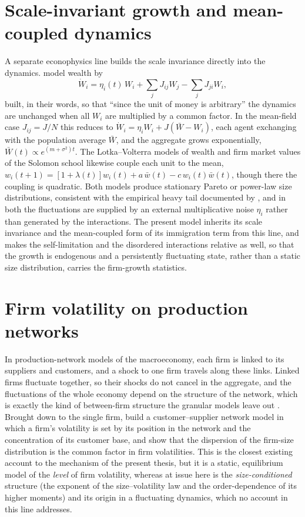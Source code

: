 \section{Scale-invariant growth and mean-coupled dynamics}
\label{sec:bg-scaleinv}

A separate econophysics line builds the scale invariance directly into the dynamics.
\citet{bouchaudmezard2000} model wealth by
\begin{equation}
    \dot W_i = \eta_i(t)\,W_i + \sum_{j} J_{ij} W_j - \sum_{j} J_{ji} W_i,
    \label{eq:bg-bm}
\end{equation}
built, in their words, so that ``since the unit of money is arbitrary'' the dynamics are
unchanged when all $W_i$ are multiplied by a common factor. In the mean-field case
$J_{ij} = J/N$ this reduces to $\dot W_i = \eta_i W_i + J(\bar W - W_i)$, each agent exchanging
with the population average $\bar W$, and the aggregate grows exponentially, $\bar W(t) \propto
e^{(m+\sigma^2)t}$. The Lotka--Volterra models of wealth and firm market values of the
Solomon school \citep{malcai2002} likewise couple each unit to the mean, $w_i(t+1) =
[1+\lambda(t)]w_i(t) + a\,\bar w(t) - c\,w_i(t)\bar w(t)$, though there the coupling is
quadratic. Both models produce stationary Pareto or power-law size
distributions, consistent with the empirical heavy tail documented by \citet{axtell2001}, and in both the fluctuations
are supplied by an external multiplicative noise $\eta_i$ rather than generated by the
interactions. The present model inherits its scale invariance and the mean-coupled form of its
immigration term from this line, and makes the
self-limitation and the disordered interactions relative as well, so that the growth is
endogenous and a persistently fluctuating state, rather than a static size distribution, carries
the firm-growth statistics.

\section{Firm volatility on production networks}
\label{sec:bg-network}

In production-network models of the macroeconomy, each firm is linked to its suppliers
and customers, and a shock to one firm travels along these links. Linked firms fluctuate
together, so their shocks do not cancel in the aggregate, and the fluctuations of the
whole economy depend on the structure of the network, which is exactly the kind of
between-firm structure the granular models leave out
\citep{acemoglu2012, carvalho2019}. Brought down to the single firm, \citet{herskovic2020}
build a customer--supplier network model in which a firm's volatility is set by its position in
the network and the concentration of its customer base, and show that the dispersion of the
firm-size distribution is the common factor in firm volatilities. This is the closest existing
account to the mechanism of the present thesis, but it is a static,
equilibrium model of the \emph{level} of firm volatility, whereas at issue here is the
\emph{size-conditioned} structure (the exponent of the size--volatility law and the
order-dependence of its higher moments) and its origin in a fluctuating dynamics, which no
account in this line addresses.


